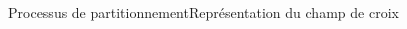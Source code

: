 \documentclass[compress,10pt,aspectratio=169]{beamer}
\begin{document}
\begin{frame}{Processus de partitionnement}{Représentation du champ de croix}
\begin{columns}
    \begin{column}{0.2\textwidth}
    \centering
{}
\end{column}
\end{columns}
\end{frame}
\end{document}
